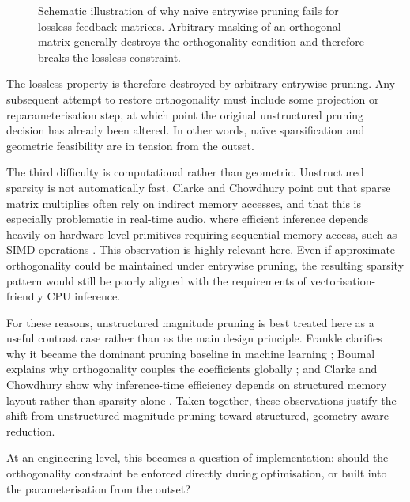 \documentclass[12pt,a4paper]{article}
\begin{document}
\begin{figure}[t]
    \caption{Schematic illustration of why naive entrywise pruning fails for lossless feedback matrices. Arbitrary masking of an orthogonal matrix generally destroys the orthogonality condition and therefore breaks the lossless constraint.}
    \label{fig:pruningbreaksorthogonality}
\end{figure}




The lossless property is therefore destroyed by arbitrary entrywise
pruning. Any subsequent attempt to restore orthogonality must
include some projection or reparameterisation step, at which point
the original unstructured pruning decision has already been altered.
In other words, naïve sparsification and geometric feasibility are in
tension from the outset.

The third difficulty is computational rather than geometric.
Unstructured sparsity is not automatically fast. Clarke and
Chowdhury point out that sparse matrix multiplies often rely on
indirect memory accesses, and that this is especially problematic in
real-time audio, where efficient inference depends heavily on
hardware-level primitives requiring sequential memory access, such
as SIMD operations \cite{clarke}. This observation
is highly relevant here. Even if approximate orthogonality could be
maintained under entrywise pruning, the resulting sparsity pattern
would still be poorly aligned with the requirements of
vectorisation-friendly CPU inference.

For these reasons, unstructured magnitude pruning is best treated
here as a useful contrast case rather than as the main design
principle. Frankle clarifies why it became the dominant pruning
baseline in machine learning \cite{frankle}; Boumal explains
why orthogonality couples the coefficients globally
\cite{boumal}; and Clarke and Chowdhury show why
inference-time efficiency depends on structured memory layout
rather than sparsity alone \cite{clarke}. Taken
together, these observations justify the shift from unstructured
magnitude pruning toward structured, geometry-aware reduction.

At an engineering level, this becomes a question of implementation: should the
orthogonality constraint be enforced directly during optimisation, or built into
the parameterisation from the outset?
\end{document}
